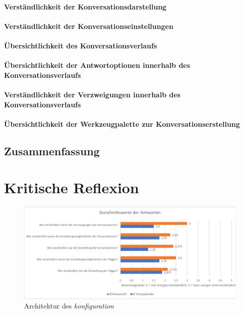 \paragraph{Verständlichkeit der Konversationsdarstellung}

\paragraph{Verständlichkeit der Konversationseinstellungen}

\paragraph{Übersichtlichkeit des Konversationsverlaufs}

\paragraph{Übersichtlichkeit der Antwortoptionen innerhalb des Konversationsverlaufs}

\paragraph{Verständlichkeit der Verzweigungen innerhalb des Konversationsverlaufs}

\paragraph{Übersichtlichkeit der Werkzeugpalette zur Konversationserstellung}




\subsection{Zusammenfassung}

\section{Kritische Reflexion}

\begin{figure}[h]
\centering
\includegraphics[width=1\textwidth]{pictures/diagramme/antwortendurchsch1}
\caption{Architektur des \emph{konfiguration}}
\label{antwortendurchsch11}
\end{figure}

